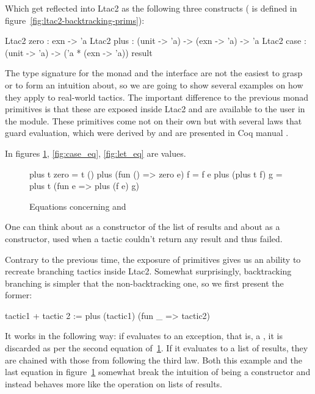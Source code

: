 Which get reflected into Ltac2 as the following three constructs ( is defined in figure~\ref{fig:ltac2-backtracking-prims}):
\begin{coq}
Ltac2 zero : exn -> 'a
Ltac2 plus : (unit -> 'a) -> (exn -> 'a) -> 'a
Ltac2 case : (unit -> 'a) -> ('a * (exn -> 'a)) result
\end{coq}

The type signature for the monad and the interface are not the easiest to grasp or to form an intuition about, so we are going to show several examples on how they apply to real-world tactics.
The important difference to the previous monad primitives is that these are exposed inside Ltac2 and are available to the user in the  module.
These primitives come not on their own but with several laws that guard evaluation, which were derived by \citet{kiselyovBacktrackingInterleavingTerminating2005} and are presented in Coq manual \cite[Section 3.3.2]{thecoqdevelopmentteamCoqProofAssistant2020}.

In figures \ref{fig:zero_plus_eq}, \ref{fig:case_eq}, \ref{fig:let_eq}  are values.
\begin{figure}[H]
\begin{coq}
plus t zero = t ()
plus (fun () => zero e) f = f e
plus (plus t f) g = plus t (fun e => plus (f e) g)
\end{coq}
\caption{Equations concerning  and }
\label{fig:zero_plus_eq}
\end{figure}

One can think about  as a  constructor of the list of results and about  as a  constructor, used when a tactic couldn't return any result and thus failed.

Contrary to the previous time, the exposure of primitives gives us an ability to recreate branching tactics inside Ltac2.
Somewhat surprisingly, backtracking branching is simpler that the non-backtracking one, so we first present the former:
\begin{coq}
tactic1 + tactic 2 := plus (tactic1) (fun _ => tactic2)
\end{coq}
It works in the following way: if  evaluates to an exception, that is, a , it is discarded as per the second equation of~\ref{fig:zero_plus_eq}.
If it evaluates to a list of results, they are chained with those from  following the third law.
Both this example and the last equation in figure~\ref{fig:zero_plus_eq} somewhat break the intuition of  being a  constructor and instead behaves more like the  operation on lists of results.

